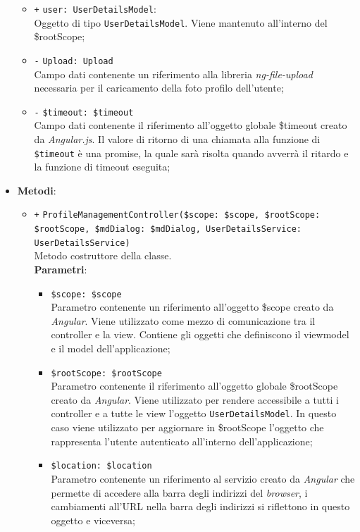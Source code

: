 \begin{itemize}
\begin{itemize}
		\item \texttt{+} \texttt{user: UserDetailsModel}: \\
		Oggetto di tipo \texttt{UserDetailsModel}. Viene mantenuto all'interno del \$rootScope; 
		\item \texttt{-} \texttt{Upload: Upload} \\
		Campo dati contenente un riferimento alla libreria \textit{ng-file-upload} necessaria per il caricamento della foto profilo dell'utente;
		\item \texttt{-} \texttt{\$timeout: \$timeout} \\
		Campo dati contenente il riferimento all'oggetto globale \$timeout creato da \textit{Angular.js}. 
		Il valore di ritorno di una chiamata alla funzione di \texttt{\$timeout} è una promise, la quale sarà risolta quando avverrà il ritardo e la funzione di timeout eseguita; 
	\end{itemize}
	\item \textbf{Metodi}:
	\begin{itemize}
		\item \texttt{+} \texttt{ProfileManagementController(\$scope: \$scope, \$rootScope: \$rootScope, \$mdDialog: \$mdDialog, UserDetailsService: UserDetailsService)} \\
		Metodo costruttore della classe. \\
		\textbf{Parametri}:
		\begin{itemize}
			\item \texttt{\$scope: \$scope} \\
			Parametro contenente un riferimento all’oggetto \$scope creato da \textit{Angular}. Viene utilizzato come mezzo di comunicazione tra il controller e la view. Contiene gli oggetti che definiscono il viewmodel e il model dell’applicazione;
			\item \texttt{\$rootScope: \$rootScope} \\
			Parametro contenente il riferimento all'oggetto globale \$rootScope creato da \textit{Angular}. Viene utilizzato per rendere accessibile a tutti i controller e a tutte le view l'oggetto \texttt{UserDetailsModel}. In questo caso viene utilizzato per aggiornare in \$rootScope l'oggetto che rappresenta l'utente autenticato all'interno dell'applicazione;
			\item \texttt{\$location: \$location} \\
			Parametro contenente un riferimento al servizio creato da \textit{Angular} che permette di accedere alla barra degli indirizzi del \textit{browser}, i cambiamenti all’URL nella barra degli indirizzi si riflettono in questo oggetto e viceversa;

\end{itemize}
\end{itemize}
\end{itemize}
